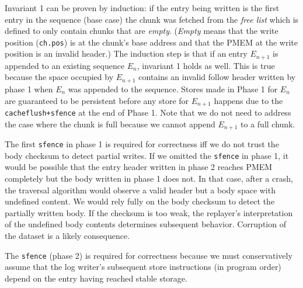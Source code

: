 \documentclass[12pt,a4paper,twoside]{book}
\begin{document}
Invariant 1 can be proven by induction:
if the entry being written is the first entry in the sequence (base case) the chunk was fetched from the \textit{free list} which is defined to only contain chunks that are \textit{empty}.
(\textit{Empty} means that the write position (\lstinline{ch.pos}) is at the chunk's base address and that the PMEM at the write position is an invalid header.)
The induction step is that if an entry $E_{n+1}$ is appended to an existing sequence $E_n$, invariant 1 holds as well.
This is true because the space occupied by $E_{n+1}$ contains an invalid follow header written by phase 1 when $E_n$ was appended to the sequence.
Stores made in Phase 1 for $E_n$ are guaranteed to be persistent before any store for $E_{n+1}$ happens due to the \lstinline{cacheflush+sfence} at the end of Phase 1.
Note that we do not need to address the case where the chunk is full because we cannot append $E_{n+1}$ to a full chunk.

The first \lstinline{sfence} in phase 1 is required for correctness iff we do not trust the body checksum to detect partial writes.
If we omitted the \lstinline{sfence} in phase 1, it would be possible that the entry header written in phase 2 reaches PMEM completely but the body written in phase 1 does not.
In that case, after a crash, the traversal algorithm would observe a valid header but a body space with undefined content.
We would rely fully on the body checksum to detect the partially written body.
If the checksum is too weak, the replayer's interpretation of the undefined body contents determines subsequent behavior.
Corruption of the dataset is a likely consequence.

The \lstinline{sfence} (phase 2) is required for correctness  because we must conservatively assume that the log writer's subsequent store instructions (in program order) depend on the entry having reached stable storage.
\end{document}
